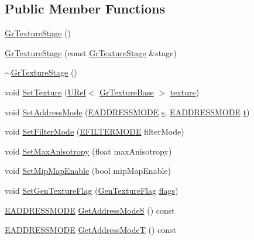 \begin{CompactItemize}
\subsection*{Public Member Functions}
\begin{CompactItemize}
\item 
\hyperlink{class_gr_texture_stage_eac3752fc6e0acac79696710b9eb0598}{GrTextureStage} ()
\item 
\hyperlink{class_gr_texture_stage_6378461758f772d3668fecbb8b9f133a}{GrTextureStage} (const \hyperlink{class_gr_texture_stage}{GrTextureStage} \&stage)
\item 
\hyperlink{class_gr_texture_stage_ed8757fd8de2d75111b96aba86c1b195}{$\sim$GrTextureStage} ()
\item 
void \hyperlink{class_gr_texture_stage_d1c9b29aa390259ccc36d6f518502801}{SetTexture} (\hyperlink{class_u_ref}{URef}$<$ \hyperlink{class_gr_texture_base}{GrTextureBase} $>$ \hyperlink{glext__bak_8h_8f486379aef534669f4f06f515e7ce6c}{texture})
\item 
void \hyperlink{class_gr_texture_stage_bd3af2826c14f1e0bb6b93e9031f4294}{SetAddressMode} (\hyperlink{class_gr_texture_stage_dea63364bc3369d0cf5ef74b76268d0e}{EADDRESSMODE} \hyperlink{glext__bak_8h_d585a1393cfa368fa9dc3d8ebff640d5}{s}, \hyperlink{class_gr_texture_stage_dea63364bc3369d0cf5ef74b76268d0e}{EADDRESSMODE} \hyperlink{glext__bak_8h_00140d6f5c548b26daf170bf16e86a6d}{t})
\item 
void \hyperlink{class_gr_texture_stage_f2d25544ef1026d7f705074db5c88902}{SetFilterMode} (\hyperlink{class_gr_texture_stage_b86144a2e97311bb975db7c2c361f048}{EFILTERMODE} filterMode)
\item 
void \hyperlink{class_gr_texture_stage_fc6ffe941788ef5073fa2c7c80c4644a}{SetMaxAnisotropy} (float maxAnisotropy)
\item 
void \hyperlink{class_gr_texture_stage_ed9af9744e9097a1745e1c9efda29141}{SetMipMapEnable} (bool mipMapEnable)
\item 
void \hyperlink{class_gr_texture_stage_4656b7b3dca1699a7ed25f89c57c190e}{SetGenTextureFlag} (\hyperlink{class_gr_texture_stage_60f59a039bf1c95b76659752ff1bf7d6}{GenTextureFlag} \hyperlink{_u_t_message_8h_0a3c0b351ab09281b662a9ff4f900a53}{flags})
\item 
\hyperlink{class_gr_texture_stage_dea63364bc3369d0cf5ef74b76268d0e}{EADDRESSMODE} \hyperlink{class_gr_texture_stage_483ace52427b80106f568437c00c64ea}{GetAddressModeS} () const 
\item 
\hyperlink{class_gr_texture_stage_dea63364bc3369d0cf5ef74b76268d0e}{EADDRESSMODE} \hyperlink{class_gr_texture_stage_9abd7581b1a3526d6842ecf8b79baf58}{GetAddressModeT} () const 

\end{CompactItemize}
\end{CompactItemize}
